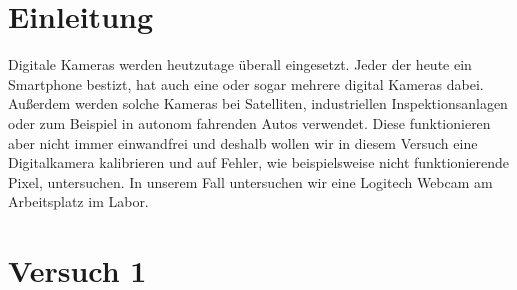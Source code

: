 \documentclass[12pt, oneside, a4paper, \docLanguage]{report}
\begin{document}

\setcounter{section}{0}



\clearpage

%
%


%
%


%
%
%

%
%




\setcounter{page}{1} 
\pagestyle{default}
%
%
\chapter{Einleitung}
\label{chap:EINL}
\begin{normalsize}
Digitale Kameras werden heutzutage überall eingesetzt. Jeder der heute ein Smartphone bestizt, hat auch eine oder sogar mehrere digital Kameras dabei. Außerdem werden solche Kameras bei Satelliten, industriellen Inspektionsanlagen oder zum Beispiel in autonom fahrenden Autos verwendet. Diese funktionieren aber nicht immer einwandfrei und deshalb wollen wir in diesem Versuch eine Digitalkamera kalibrieren und auf Fehler, wie beispielsweise nicht funktionierende Pixel, untersuchen. In unserem Fall untersuchen wir eine Logitech Webcam am Arbeitsplatz im Labor.
\end{normalsize}


%
%
\chapter{Versuch 1}
\label{chap:VERSUCH_1}
\end{document}
